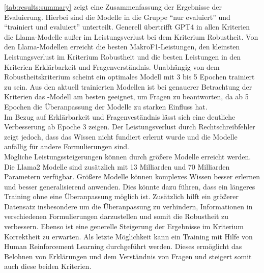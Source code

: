 \cref{tab:results:summary} zeigt eine Zusammenfassung der Ergebnisse der Evaluierung.
Hierbei sind die Modelle in die Gruppe \enquote{nur evaluiert} und \enquote{trainiert und evaluiert} unterteilt.
Generell übertrifft GPT4 in allen Kriterien die Llama-Modelle außer im Leistungsverlust bei dem Kriterium Robustheit.
Von den Llama-Modellen erreicht \lsa{} die besten MakroF1-Leistungen, \lioa{} den kleinsten Leistungsverlust im Kriterium Robustheit und \lea{} die besten Leistungen in den Kriterien Erklärbarkeit und Fragenverständnis.
Unabhängig von dem Robustheitskriterium scheint ein optimales Modell mit 3 bis 5 Epochen trainiert zu sein.
Aus den aktuell trainierten Modellen ist bei genauerer Betrachtung der Kriterien das \lea-Modell am besten geeignet, um Fragen zu beantworten, da ab 5 Epochen die Überanpassung der Modelle zu starken Einfluss hat.\\

Im Bezug auf Erklärbarkeit und Fragenveständnis lässt sich eine deutliche Verbesserung ab Epoche 3 zeigen.
Der Leistungsverlust durch Rechtschreibfehler zeigt jedoch, dass das Wissen nicht fundiert erlernt wurde und die Modelle anfällig für andere Formulierungen sind.\\

Mögliche Leistungssteigerungen können durch größere Modelle erreicht werden.
Die Llama2 Modelle sind zusätzlich mit 13 Milliarden und 70 Milliarden Parametern verfügbar.
Größere Modelle können komplexes Wissen besser erlernen und besser generalisierend anwenden.
Dies könnte dazu führen, dass ein längeres Training ohne eine Überanpassung möglich ist.
Zusätzlich hilft ein größerer Datensatz insbesondere um die Überanpassung zu verhindern, Informationen in verschiedenen Formulierungen darzustellen und somit die Robustheit zu verbessern.
Ebenso ist eine generelle Steigerung der Ergebnisse im Kriterium Korrektheit zu erwarten.
Als letzte Möglichkeit kann ein Training mit Hilfe von Human Reinforcement Learning durchgeführt werden.
Dieses ermöglicht das Belohnen von Erklärungen und dem Verständnis von Fragen und steigert somit auch diese beiden Kriterien.
